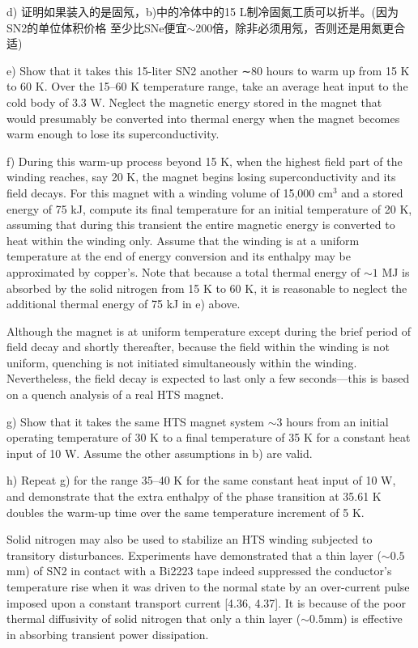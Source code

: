 d) 证明如果装入的是固氖，b)中的冷体中的15 L制冷固氮工质可以折半。(因为SN2的单位体积价格
至少比SNe便宜$\sim 200$倍，除非必须用氖，否则还是用氮更合适)


e) Show that it takes this 15-liter SN2 another ∼80 hours to warm up from 15 K
to 60 K. Over the 15–60 K temperature range, take an average heat input to
the cold body of 3.3 W. Neglect the magnetic energy stored in the magnet
that would presumably be converted into thermal energy when the magnet
becomes warm enough to lose its superconductivity.


f) During this warm-up process beyond 15 K, when the highest field part of
the winding reaches, say 20 K, the magnet begins losing superconductivity
and its field decays. For this magnet with a winding volume of 15,000 $\mathrm{cm^3}$
and a stored energy of 75 kJ, compute its final temperature for an initial
temperature of 20 K, assuming that during this transient the entire magnetic
energy is converted to heat within the winding only. Assume that the winding
is at a uniform temperature at the end of energy conversion and its enthalpy
may be approximated by copper’s. Note that because a total thermal energy
of $\sim 1$ MJ is absorbed by the solid nitrogen from 15 K to 60 K, it is reasonable
to neglect the additional thermal energy of 75 kJ in e) above.


Although the magnet is at uniform temperature except during the brief period of field decay and shortly thereafter, because the field within the winding
is not uniform, quenching is not initiated simultaneously within the winding.
Nevertheless, the field decay is expected to last only a few seconds—this is
based on a quench analysis of a real HTS magnet.


g) Show that it takes the same HTS magnet system $\sim 3$ hours from an initial
operating temperature of 30 K to a final temperature of 35 K for a constant
heat input of 10 W. Assume the other assumptions in b) are valid.


h) Repeat g) for the range 35–40 K for the same constant heat input of 10 W,
and demonstrate that the extra enthalpy of the phase transition at 35.61 K
doubles the warm-up time over the same temperature increment of 5 K.

Solid nitrogen may also be used to stabilize an HTS winding subjected to transitory
disturbances. Experiments have demonstrated that a thin layer ($\sim 0.5$ mm) of SN2
in contact with a Bi2223 tape indeed suppressed the conductor’s temperature rise
when it was driven to the normal state by an over-current pulse imposed upon a
constant transport current [4.36, 4.37]. It is because of the poor thermal diffusivity
of solid nitrogen that only a thin layer ($\sim 0.5$mm) is effective in absorbing transient
power dissipation.

